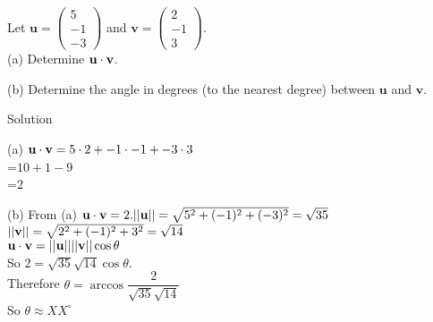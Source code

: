 \documentclass[12pt]{article}
\begin{document}
 

Let $ \mathbf{u}= \left(\begin{array}{c} 5 \\ -1\\-3\end{array} \right)$ and $ \mathbf{ v} =\left(\begin{array}{c} 2 \\ -1\\3\end{array} \right) $. \\

(a) Determine ${\bf u} \cdot {\bf v}$.

(b) Determine the angle in degrees (to the nearest degree) between $ \mathbf {u} $ and $ \mathbf{v}$.

\vspace*{5mm}

Solution

(a) ${\bf u} \cdot {\bf v}=5 \cdot 2 + -1 \cdot -1 + -3\cdot3$\\
=$10+1-9$\\
=$2$

(b) From (a) ${\bf u} \cdot {\bf v}=2.\\
 ||{\bf u}||=\sqrt{5^2+(-1)^2+(-3)^2}\\
 =\sqrt{35}$\\
  $||{\bf v}||=\sqrt{2^2+(-1)^2+3^2}\\
 =\sqrt{14}$\\
  ${\bf u} \cdot {\bf v}= ||{\bf u}||||{\bf v}||\cos\theta$\\
 So $2=\sqrt{35}\sqrt{14}\cos\theta$.\\
 Therefore $\theta=\arccos\dfrac{2}{\sqrt{35}\sqrt{14}}$\\
 So $\theta\approx XX ^{\circ}$
 
 
\end{document}
